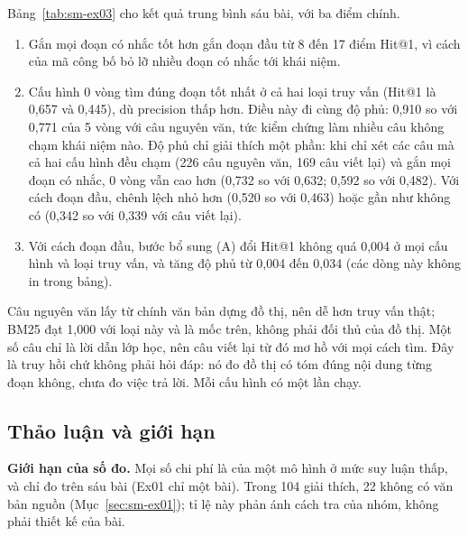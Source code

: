 Bảng~\ref{tab:sm-ex03} cho kết quả trung bình sáu bài, với ba điểm chính.
\begin{enumerate}
\item Gắn mọi đoạn có nhắc tốt hơn gắn đoạn đầu từ 8 đến 17 điểm Hit@1, vì cách của mã công bố bỏ lỡ nhiều đoạn có nhắc tới khái niệm.
\item Cấu hình 0 vòng tìm đúng đoạn tốt nhất ở cả hai loại truy vấn (Hit@1 là 0,657 và 0,445), dù precision thấp hơn. Điều này đi cùng độ phủ: 0,910 so với 0,771 của 5 vòng với câu nguyên văn, tức kiểm chứng làm nhiều câu không chạm khái niệm nào. Độ phủ chỉ giải thích một phần: khi chỉ xét các câu mà cả hai cấu hình đều chạm (226 câu nguyên văn, 169 câu viết lại) và gắn mọi đoạn có nhắc, 0 vòng vẫn cao hơn (0,732 so với 0,632; 0,592 so với 0,482). Với cách đoạn đầu, chênh lệch nhỏ hơn (0,520 so với 0,463) hoặc gần như không có (0,342 so với 0,339 với câu viết lại).
\item Với cách đoạn đầu, bước bổ sung (A) đổi Hit@1 không quá 0,004 ở mọi cấu hình và loại truy vấn, và tăng độ phủ từ 0,004 đến 0,034 (các dòng này không in trong bảng).
\end{enumerate}

Câu nguyên văn lấy từ chính văn bản dựng đồ thị, nên dễ hơn truy vấn thật; BM25 đạt 1,000 với loại này và là mốc trên, không phải đối thủ của đồ thị.
Một số câu chỉ là lời dẫn lớp học, nên câu viết lại từ đó mơ hồ với mọi cách tìm.
Đây là truy hồi chứ không phải hỏi đáp: nó đo đồ thị có tóm đúng nội dung từng đoạn không, chưa đo việc trả lời.
Mỗi cấu hình có một lần chạy.

\subsection{Thảo luận và giới hạn}\label{sec:sm-exp-discuss}
\textbf{Giới hạn của số đo.}
Mọi số chi phí là của một mô hình ở mức suy luận thấp, và chỉ đo trên sáu bài (Ex01 chỉ một bài).
Trong 104 giải thích, 22 không có văn bản nguồn (Mục~\ref{sec:sm-ex01}); tỉ lệ này phản ánh cách tra của nhóm, không phải thiết kế của bài.

